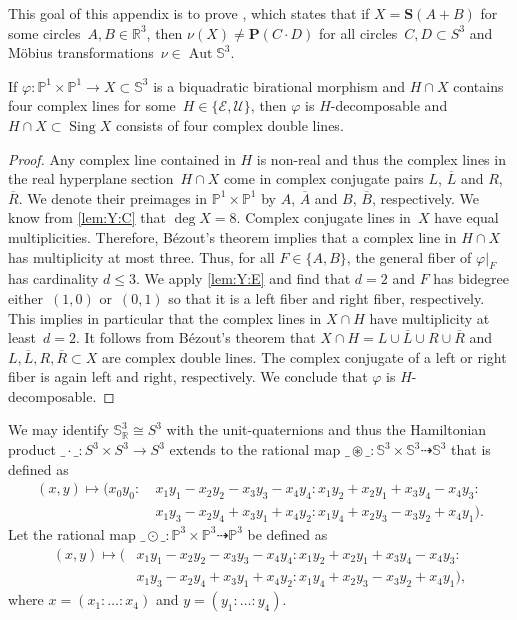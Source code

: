 \documentclass[11pt]{article}
\newcommand{\RL}[2]{\Cref{lem:#1}\ref{lem:#1:#2}}
\newcommand{\R}{\mathbb{R}}
\renewcommand{\P}{\mathbb{P}}
\renewcommand{\S}{\mathbb{S}}
\newcommand{\bP}{\mathbf{P}}
\newcommand{\bS}{\mathbf{S}}
\newcommand{\cE}{\mathcal{E}}
\newcommand{\cU}{\mathcal{U}}
\newcommand{\oA}{{\overline{A}}}
\newcommand{\oB}{{\overline{B}}}
\newcommand{\oL}{{\overline{L}}}
\newcommand{\oR}{{\overline{R}}}
\renewcommand{\c}{\colon}
\newcommand{\dto}{\dasharrow}
\newcommand{\aut}{\operatorname{Aut}}
\newcommand{\Sing}{\operatorname{Sing}}
\newcommand{\resp}{respectively}
\begin{document}
This goal of this appendix is to prove ,
which states that if $X=\bS(A+B)$ for some circles~$A,B\in\R^3$,
then $\nu(X)\neq\bP(C\cdot D)$ for all circles~$C,D\subset S^3$ and M\"obius transformations~$\nu\in\aut\S^3$.

\begin{lemma}
\label{lem:LLRR}
If $\varphi\c\P^1\times\P^1\to X\subset\S^3$ is a biquadratic birational morphism
and $H\cap X$ contains four complex lines for some~$H\in\{\cE,\cU\}$,
then $\varphi$ is $H$-decomposable
and $H\cap X\subset\Sing X$ consists of four complex double lines.
\end{lemma}

\begin{proof}
Any complex line contained in $H$ is non-real
and thus the complex lines in the real hyperplane section~$H\cap X$
come in complex conjugate pairs $L$, $\oL$ and $R$, $\oR$.
We denote their preimages in $\P^1\times\P^1$ by $A$, $\oA$ and $B$, $\oB$, \resp.
We know from \RL{Y}{C} that $\deg X=8$.
Complex conjugate lines in~$X$ have equal multiplicities.
Therefore, B\'ezout's theorem implies that a complex line in $H\cap X$ has multiplicity
at most three.
Thus, for all $F\in\{A,B\}$, the general fiber of $\varphi|_F$ has cardinality $d\leq 3$.
We apply \RL{Y}{E} and find that $d=2$ and $F$ has bidegree either~$(1,0)$ or~$(0,1)$
so that it is a left fiber and right fiber, \resp.
This implies in particular that the complex lines in $X\cap H$ have multiplicity at least~$d=2$.
It follows from B\'ezout's theorem that
$X\cap H=L\cup\oL\cup R\cup\oR$ and $L,\oL,R,\oR\subset X$ are complex double lines.
The complex conjugate of a left or right fiber is again left and right, \resp.
We conclude that $\varphi$ is $H$-decomposable.
\end{proof}

We may identify $\S^3_\R\cong S^3$ with the unit-quaternions
and thus the Hamiltonian product $\_\cdot\_\c S^3\times S^3\to S^3$
extends to the rational map $\_\circledast\_\c\S^3\times\S^3\dto \S^3$ that is defined as
\begin{align*}
(x,y)\mapsto (x_0y_0:& ~x_1y_1-x_2y_2-x_3y_3-x_4y_4:x_1y_2+x_2y_1+x_3y_4-x_4y_3:\\
                     & ~x_1y_3-x_2y_4+x_3y_1+x_4y_2:x_1y_4+x_2y_3-x_3y_2+x_4y_1).
\end{align*}
Let the rational map $\_\odot\_\c\P^3\times\P^3\dto \P^3$ be defined as
\begin{align*}
(x,y)\mapsto(&x_1y_1-x_2y_2-x_3y_3-x_4y_4:x_1y_2+x_2y_1+x_3y_4-x_4y_3:\\
             &x_1y_3-x_2y_4+x_3y_1+x_4y_2:x_1y_4+x_2y_3-x_3y_2+x_4y_1),
\end{align*}
where $x=(x_1:\ldots:x_4)$ and $y=(y_1:\ldots:y_4)$.
\end{document}
